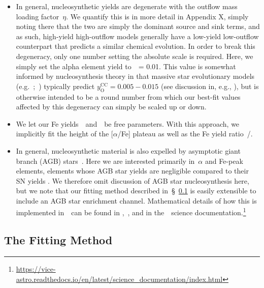 \documentclass[ms.tex]{subfiles}
\begin{document}
\begin{itemize}

	\item In general, nucleosynthetic yields are degenerate with the outflow
	mass loading factor~$\eta$.
	We quantify this is in more detail in Appendix X, simply noting there that
	the two are simply the dominant source and sink terms, and as such,
	high-yield high-outflow models generally have a low-yield low-outflow
	counterpart that predicts a similar chemical evolution.
	In order to break this degeneracy, only one number setting the absolute
	scale is required.
	Here, we simply set the alpha element yield to~\yacc~= 0.01.
	This value is somewhat informed by nucleosynthesis theory in that
	massive star evolutionary models (e.g.~\citealp{Sukhbold2016,
	Limongi2018};~\citealp*{Nomoto2013}) typically predict
	$y_\text{O}^\text{CC} = 0.005 - 0.015$ (see discussion in, e.g.,
	\citealp{Weinberg2017, Johnson2020}), but is otherwise intended to be a
	round number from which our best-fit values affected by this degeneracy can
	simply be scaled up or down.

	\item We let our Fe yields~\yfecc~and~\yfeia~be free parameters.
	With this approach, we implicitly fit the height of the [$\alpha$/Fe]
	plateau as well as the Fe yield ratio~\yfecc/\yfeia.

	\item In general, nucleosynthetic material is also expelled by asymptotic
	giant branch (AGB) stars~\citep[e.g.][]{Cristallo2011, Cristallo2015,
	Ventura2013, Karakas2016, Karakas2018}.
	Here we are interested primarily in~$\alpha$ and Fe-peak elements, elements
	whose AGB star yields are negligible compared to their SN yields
	\citep[e.g.][]{Johnson2019}.
	We therefore omit discussion of AGB star nucleosynthesis here, but we note
	that our fitting method described in~\S~\ref{sec:methods:fitting} is easily
	extensible to include an AGB star enrichment channel.
	Mathematical details of how this is implemented in~\vice~can be found in
	\citet{Johnson2020},~\citet{Johnson2022}, and in the~\vice~science
	documentation.\footnote{
		\url{https://vice-astro.readthedocs.io/en/latest/science_documentation/index.html}
	}

\end{itemize}


\subsection{The Fitting Method}
\label{sec:methods:fitting}
\end{document}
